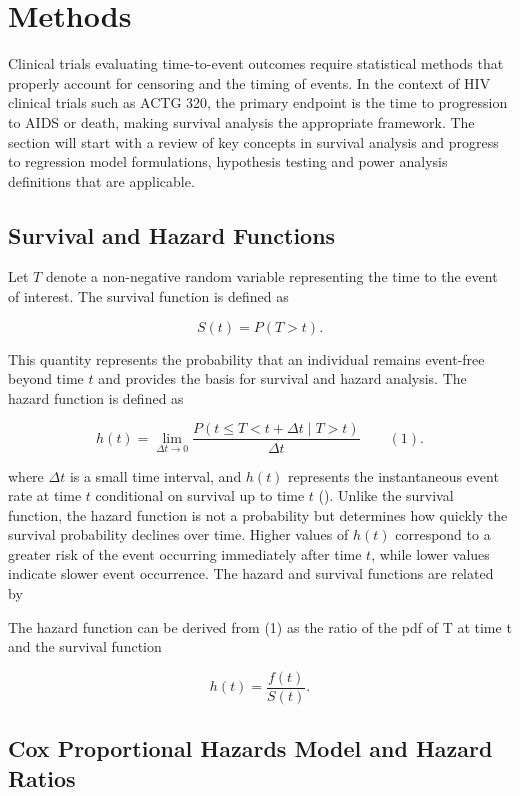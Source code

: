 \documentclass[
  letterpaper,
  DIV=11,
  numbers=noendperiod]{scrartcl}
\begin{document}
\section{Methods}\label{methods}

Clinical trials evaluating time-to-event outcomes require statistical
methods that properly account for censoring and the timing of events. In
the context of HIV clinical trials such as ACTG 320, the primary
endpoint is the time to progression to AIDS or death, making survival
analysis the appropriate framework. The section will start with a review
of key concepts in survival analysis and progress to regression model
formulations, hypothesis testing and power analysis definitions that are
applicable.

\subsection{Survival and Hazard
Functions}\label{survival-and-hazard-functions}

Let \(T\) denote a non-negative random variable representing the time to
the event of interest. The survival function is defined as

\[
S(t) = P(T > t).
\]

This quantity represents the probability that an individual remains
event-free beyond time \(t\) and provides the basis for survival and
hazard analysis. The hazard function is defined as

\[
h(t) = \lim_{\Delta t \to 0} \frac{P(t \le T < t+\Delta t \mid T > t)}{\Delta t} \qquad (1).
\]

where \(\Delta t\) is a small time interval, and \(h(t)\) represents the
instantaneous event rate at time \(t\) conditional on survival up to
time \(t\) (). Unlike the
survival function, the hazard function is not a probability but
determines how quickly the survival probability declines over time.
Higher values of \(h(t)\) correspond to a greater risk of the event
occurring immediately after time \(t\), while lower values indicate
slower event occurrence. The hazard and survival functions are related
by

The hazard function can be derived from (1) as the ratio of the pdf of T
at time t and the survival function

\[
h(t) = \frac{f(t)}{S(t)}.
\]

\subsection{Cox Proportional Hazards Model and Hazard
Ratios}\label{cox-proportional-hazards-model-and-hazard-ratios}
\end{document}
